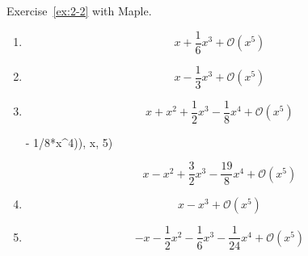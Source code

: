 \begin{exercise}
    Exercise~\ref{ex:2-2} with Maple.
\end{exercise}
\begin{solution}
    \begin{enumerate}[label=(\alph*)]
        \item \begin{mapleinput}
\end{mapleinput}\begin{mapleoutput}
    \[x+\frac{1}{6} x^{3}+\mathcal{O}\left(x^{5}\right)\]
\end{mapleoutput} \item \begin{mapleinput}
\end{mapleinput} \begin{mapleoutput}
    \[x-\frac{1}{3} x^{3}+\mathcal{O}\left(x^{5}\right)\]
\end{mapleoutput} \item \begin{mapleinput}
\end{mapleinput} \begin{mapleoutput}
\[x+x^{2}+\frac{1}{2} x^{3}-\frac{1}{8} x^{4}+\mathcal{O}\left(x^{5}\right)\]
\end{mapleoutput} \begin{mapleinput}
  - 1/8*x^4)), x, 5)
\end{mapleinput} \begin{mapleoutput}
\[x-x^{2}+\frac{3}{2} x^{3}-\frac{19}{8} x^{4}+\mathcal{O}\left(x^{5}\right)\]
\end{mapleoutput}\item \begin{mapleinput}
\end{mapleinput} \begin{mapleoutput}
    \[x-x^{3}+\mathcal{O}\left(x^{5}\right)\]
\end{mapleoutput} \item \begin{mapleinput}
\end{mapleinput} \begin{mapleoutput}
\[-x-\frac{1}{2} x^{2}-\frac{1}{6} x^{3}-\frac{1}{24} x^{4}+\mathcal{O}\left(x^{5}\right)\]
\end{mapleoutput}
    \end{enumerate}
\end{solution}


